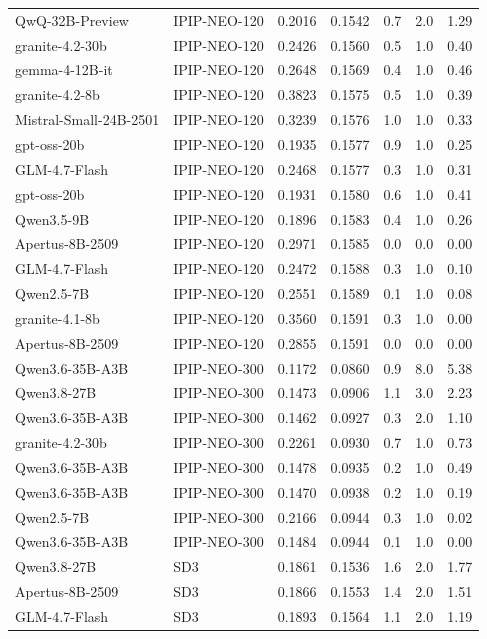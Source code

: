 \begin{tabular}{llrrrrr}
QwQ-32B-Preview & IPIP-NEO-120 & 0.2016 & 0.1542 & 0.7 & 2.0 & 1.29\\
granite-4.2-30b & IPIP-NEO-120 & 0.2426 & 0.1560 & 0.5 & 1.0 & 0.40\\
gemma-4-12B-it & IPIP-NEO-120 & 0.2648 & 0.1569 & 0.4 & 1.0 & 0.46\\
granite-4.2-8b & IPIP-NEO-120 & 0.3823 & 0.1575 & 0.5 & 1.0 & 0.39\\
Mistral-Small-24B-2501 & IPIP-NEO-120 & 0.3239 & 0.1576 & 1.0 & 1.0 & 0.33\\
gpt-oss-20b & IPIP-NEO-120 & 0.1935 & 0.1577 & 0.9 & 1.0 & 0.25\\
GLM-4.7-Flash & IPIP-NEO-120 & 0.2468 & 0.1577 & 0.3 & 1.0 & 0.31\\
gpt-oss-20b & IPIP-NEO-120 & 0.1931 & 0.1580 & 0.6 & 1.0 & 0.41\\
Qwen3.5-9B & IPIP-NEO-120 & 0.1896 & 0.1583 & 0.4 & 1.0 & 0.26\\
Apertus-8B-2509 & IPIP-NEO-120 & 0.2971 & 0.1585 & 0.0 & 0.0 & 0.00\\
GLM-4.7-Flash & IPIP-NEO-120 & 0.2472 & 0.1588 & 0.3 & 1.0 & 0.10\\
Qwen2.5-7B & IPIP-NEO-120 & 0.2551 & 0.1589 & 0.1 & 1.0 & 0.08\\
granite-4.1-8b & IPIP-NEO-120 & 0.3560 & 0.1591 & 0.3 & 1.0 & 0.00\\
Apertus-8B-2509 & IPIP-NEO-120 & 0.2855 & 0.1591 & 0.0 & 0.0 & 0.00\\
Qwen3.6-35B-A3B & IPIP-NEO-300 & 0.1172 & 0.0860 & 0.9 & 8.0 & 5.38\\
Qwen3.8-27B & IPIP-NEO-300 & 0.1473 & 0.0906 & 1.1 & 3.0 & 2.23\\
Qwen3.6-35B-A3B & IPIP-NEO-300 & 0.1462 & 0.0927 & 0.3 & 2.0 & 1.10\\
granite-4.2-30b & IPIP-NEO-300 & 0.2261 & 0.0930 & 0.7 & 1.0 & 0.73\\
Qwen3.6-35B-A3B & IPIP-NEO-300 & 0.1478 & 0.0935 & 0.2 & 1.0 & 0.49\\
Qwen3.6-35B-A3B & IPIP-NEO-300 & 0.1470 & 0.0938 & 0.2 & 1.0 & 0.19\\
Qwen2.5-7B & IPIP-NEO-300 & 0.2166 & 0.0944 & 0.3 & 1.0 & 0.02\\
Qwen3.6-35B-A3B & IPIP-NEO-300 & 0.1484 & 0.0944 & 0.1 & 1.0 & 0.00\\
Qwen3.8-27B & SD3 & 0.1861 & 0.1536 & 1.6 & 2.0 & 1.77\\
Apertus-8B-2509 & SD3 & 0.1866 & 0.1553 & 1.4 & 2.0 & 1.51\\
GLM-4.7-Flash & SD3 & 0.1893 & 0.1564 & 1.1 & 2.0 & 1.19\\

\end{tabular}
